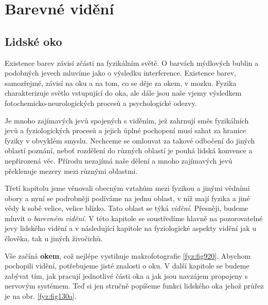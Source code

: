 \setchaptertoc
\chapter{Barevné vidění}\label{fyz:IchapXXXV}

  \section{Lidské oko}\label{fyz:IchapXXXVsecI}
    Existence barev závisí zčásti na fyzikálním světě. O barvách mýdlových bublin a podobných jevech
    mluvíme jako o výsledku interference. Existence barev, samozřejmé, závisí na oku a na tom, co se
    děje za okem, v mozku. Fyzika charakterizuje světlo vstupující do oka, ale dále jsou naše vjemy
    výsledkem fotochemicko-neurologických procesů a psychologické odezvy.
    
    Je mnoho zajímavých jevů spojených s viděním, jež zahrnují směs fyzikálních jevů a
    fyziologických procesů a jejich úplné pochopení musí sahat za hranice fyziky v obvyklém smyslu.
    Nechceme se omlouvat za takové odbočení do jiných oblastí poznání, neboť rozdělení do různých
    oblastí je pouhá lidská konvence a nepřirozená věc. Přírodu nezajímá naše dělení a mnoho
    zajímavých jevů překlenuje mezery mezi různými oblastmi.
   
    Třetí kapitolu jsme věnovali obecným vztahům mezi fyzikou a jinými vědními obory a nyní se 
    podrobněji podíváme na jednu oblast, v níž mají fyzika a jiné vědy k sobě velice, velice 
    blízko. Tato oblast se týká \emph{vidění}. Přesněji, budeme mluvit o \emph{barevném vidění}. V 
    této kapitole se soustředíme hlavně na pozorovatelné jevy lidského vidění a v následující 
    kapitole na fyziologické aspekty vidění jak u člověka, tak u jiných živočichů.
    
    Vše začíná \textbf{okem}, což nejlépe vystihuje makrofotografie \ref{fyz:fig920}. Abychom
    pochopili vidění, potřebujeme jisté znalosti o oku. V další kapitole se budeme zabývat tím, jak
    pracují jednotlivé části oka a jak jsou navzájem propojeny s nervovým systémem. Teď si jen
    stručně popíšeme funkci lidského oka jehož průřez je na obr. \ref{fyz:fig130a}.

